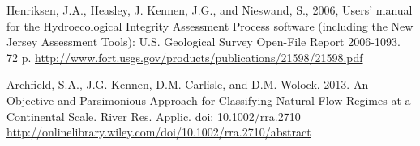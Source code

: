 \documentclass[a4paper,11pt]{article}\usepackage[]{graphicx}\usepackage[]{color}
\begin{document}
\begin{thebibliography}{10}

Henriksen, J.A., Heasley, J. Kennen, J.G., and Nieswand, S., 2006, Users' manual for the Hydroecological Integrity Assessment Process software (including the New Jersey Assessment Tools): U.S. Geological Survey Open-File Report 2006-1093. 72 p.
\url{http://www.fort.usgs.gov/products/publications/21598/21598.pdf}

Archfield, S.A., J.G. Kennen, D.M. Carlisle, and D.M. Wolock. 2013. An Objective and Parsimonious Approach for Classifying Natural Flow Regimes at a Continental Scale. River Res. Applic. doi: 10.1002/rra.2710
\url{http://onlinelibrary.wiley.com/doi/10.1002/rra.2710/abstract}

\end{thebibliography}
\end{document}
